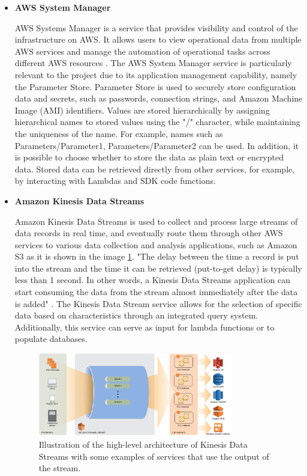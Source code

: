 \begin{itemize}
    \item \textbf{AWS System Manager}
    
    AWS Systems Manager is a service that provides visibility and control of the infrastructure on AWS.  It allows users to view operational data from multiple AWS services and manage the automation of operational tasks across different AWS resources \cite{AWSSM}. The AWS System Manager service is particularly relevant to the project due to its application management capability, namely the Parameter Store. Parameter Store is used to securely store configuration data and secrets, such as passwords, connection strings, and Amazon Machine Image (AMI) identifiers. Values are stored hierarchically by assigning hierarchical names to stored values using the "/" character, while maintaining the uniqueness of the name. For example, names such as Parameters/Parameter1, Parameters/Parameter2 can be used. In addition, it is possible to choose whether to store the data as plain text or encrypted data. Stored data can be retrieved directly from other services, for example, by interacting with Lambdas and SDK code functions.
    
    \item \textbf{Amazon Kinesis Data Streams}
    
    Amazon Kinesis Data Streams is used to collect and process large streams of data records in real time, and eventually route them through other AWS services to various data collection and analysis applications, such as Amazon S3 as it is shown in the image \ref{fig:AmazonKinesis}. "The delay between the time a record is put into the stream and the time it can be retrieved (put-to-get delay) is typically less than 1 second. In other words, a Kinesis Data Streams application can start consuming the data from the stream almost immediately after the data is added" \cite{AWSKinesis}. The Kinesis Data Stream service allows for the selection of specific data based on characteristics through an integrated query system. Additionally, this service can serve as input for lambda functions or to populate databases. 
    \begin{figure}[h]  %
        \centering
        \includegraphics[width=0.8\textwidth]{images/AmazonKinesis.png}  %
        \caption{Illustration of the high-level architecture of Kinesis Data Streams with some examples of services that use the output of the stream. \cite{AmazonKinesis}}
        \label{fig:AmazonKinesis}
    \end{figure}
    

\end{itemize}
